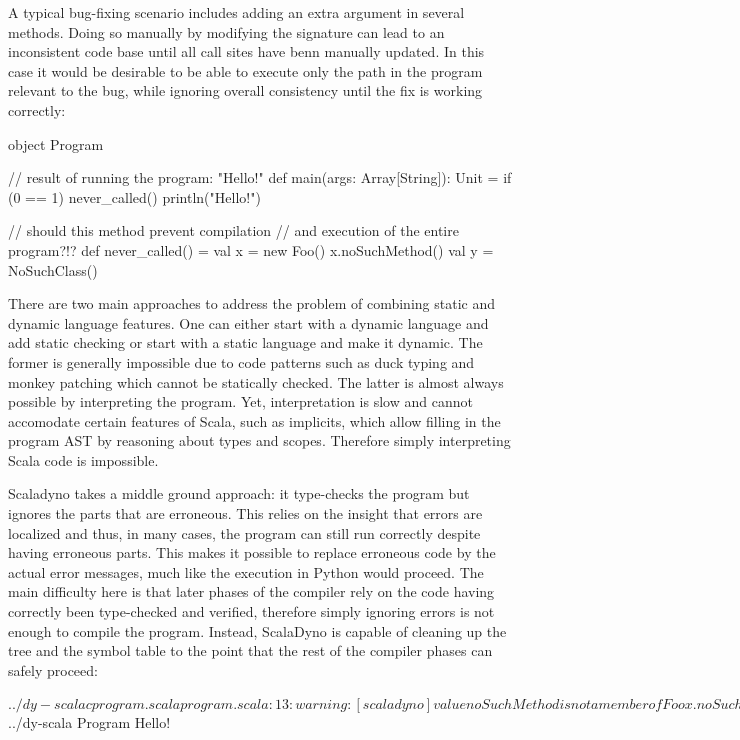A typical bug-fixing scenario includes adding an extra argument in several methods. Doing so manually by modifying the signature can lead to an inconsistent code base until all call sites have benn manually updated. In this case it would be desirable to be able to execute only the path in the program relevant to the bug, while ignoring overall consistency until the fix is working correctly:

\begin{lstlisting-nobreak}
 object Program {
   // result of running the program: "Hello!"
   def main(args: Array[String]): Unit = {
     if (0 == 1)
       never_called()
     println("Hello!")
   }

   // should this method prevent compilation
   // and execution of the entire program?!?
   def never_called() = {
     val x = new Foo()
     x.noSuchMethod()
     val y = NoSuchClass()
   }
 }
\end{lstlisting-nobreak}

There are two main approaches to address the problem of combining static and dynamic language features. One can either start with a dynamic language and add static checking or start with a static language and make it dynamic. The former is generally impossible due to code patterns such as duck typing and monkey patching which cannot be statically checked. The latter is almost always possible by interpreting the program. Yet, interpretation is slow and cannot accomodate certain features of Scala, such as implicits, which allow filling in the program AST by reasoning about types and scopes. Therefore simply interpreting Scala code is impossible.

Scaladyno takes a middle ground approach: it type-checks the program but ignores the parts that are erroneous. This relies on the insight that errors are localized and thus, in many cases, the program can still run correctly despite having erroneous parts. This makes it possible to replace erroneous code by the actual error messages, much like the execution in Python would proceed. The main difficulty here is that later phases of the compiler rely on the code having correctly been type-checked and verified, therefore simply ignoring errors is not enough to compile the program. Instead, ScalaDyno is capable of cleaning up the tree and the symbol table to the point that the rest of the compiler phases can safely proceed:

\begin{lstlisting-nobreak}
$ ../dy-scalac program.scala
program.scala:13: warning: [scaladyno] value noSuchMethod is not a member of Foo
     x.noSuchMethod()
       ^
program.scala:14: warning: [scaladyno] not found: value NoSuchClass
     val y = NoSuchClass()
             ^
two warnings found

$ ../dy-scala Program
Hello!
\end{lstlisting-nobreak}

